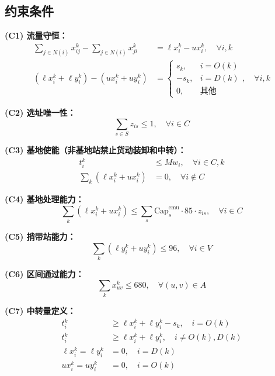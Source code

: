 \documentclass[12pt,a4paper,fontset=none]{ctexart}
\begin{document}
\subsection*{约束条件}

\textbf{(C1) 流量守恒：}
\begin{align}
\sum_{j \in N(i)} x_{ij}^k - \sum_{j \in N(i)} x_{ji}^k &= \ell x_i^k - ux_i^k, \quad \forall i,k \label{eq:c1a}\\
(\ell x_i^k + \ell y_i^k) - (ux_i^k + uy_i^k) &= 
\begin{cases}
s_k,   & i=O(k)\\
-s_k,  & i=D(k)\\
0,     & \text{其他}
\end{cases}, \quad \forall i,k \label{eq:c1b}
\end{align}

\textbf{(C2) 选址唯一性：}
\begin{equation}
\sum_{s \in S} z_{is} \leq 1, \quad \forall i \in C \label{eq:c2}
\end{equation}

\textbf{(C3) 基地使能（非基地站禁止货动装卸和中转）：}
\begin{align}
t_i^k &\leq M w_i, \quad \forall i \in C, k \label{eq:c3a}\\
\sum_k (\ell x_i^k + ux_i^k) &= 0, \quad \forall i \notin C \label{eq:c3b}
\end{align}

\textbf{(C4) 基地处理能力：}
\begin{equation}
\sum_k (\ell x_i^k + ux_i^k) \leq \sum_s \text{Cap}_s^{\text{emu}} \cdot 85 \cdot z_{is}, \quad \forall i \in C \label{eq:c4}
\end{equation}

\textbf{(C5) 捎带站能力：}
\begin{equation}
\sum_k (\ell y_i^k + uy_i^k) \leq 96, \quad \forall i \in V \label{eq:c5}
\end{equation}

\textbf{(C6) 区间通过能力：}
\begin{equation}
\sum_k x_{uv}^k \leq 680, \quad \forall (u,v) \in A \label{eq:c6}
\end{equation}

\textbf{(C7) 中转量定义：}
\begin{align}
t_i^k &\geq \ell x_i^k + \ell y_i^k - s_k, \quad i=O(k) \label{eq:c7a}\\
t_i^k &\geq \ell x_i^k + \ell y_i^k, \quad i \neq O(k), D(k) \label{eq:c7b}\\
\ell x_i^k = \ell y_i^k &= 0, \quad i=D(k) \label{eq:c7c}\\
ux_i^k = uy_i^k &= 0, \quad i=O(k) \label{eq:c7d}
\end{align}
\end{document}
